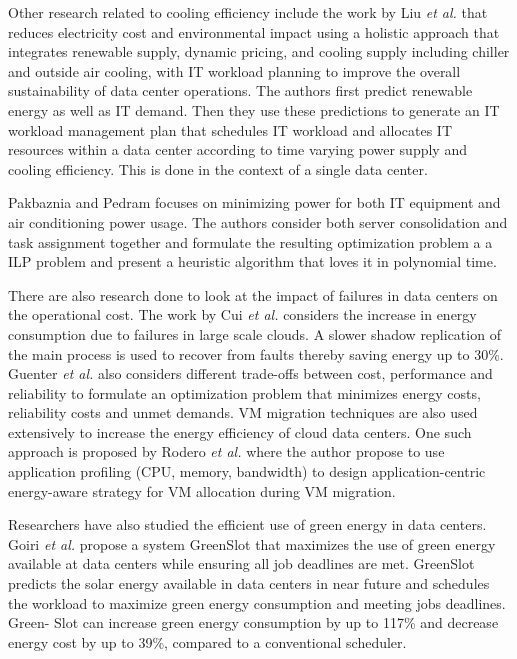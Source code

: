 \documentclass[conference,12pt]{IEEEtran}
\begin{document}
Other research related to cooling efficiency include the work by Liu \textit{et al.} \cite{liu2012renewable}  that reduces electricity cost and environmental impact using a holistic approach that integrates renewable supply, dynamic pricing, and cooling supply including chiller and outside air cooling, with IT workload planning to improve the overall sustainability of data center operations. The authors first predict renewable energy as well as IT demand. Then they use these predictions to generate an IT workload management plan that schedules IT workload and allocates IT resources within a data center according to time varying power supply and cooling efficiency. This is done in the context of a single data center.

\iffalse
Pakbaznia and Pedram \cite{pakbaznia2009minimizing} focuses on minimizing power for both IT equipment and air conditioning power usage. The authors consider both server consolidation and task assignment together and formulate the resulting optimization problem a a ILP problem and present a heuristic algorithm that loves it in polynomial time.

There are also research done to look at the impact of failures in data centers on the operational cost. The work by Cui \textit{et al.} \cite{cui2014shadows} considers the increase in energy consumption due to failures in large scale clouds. A slower shadow replication of the main process is used to recover from faults thereby saving energy up to 30\%. Guenter \textit{et al.} \cite{guenter2011managing} also considers different trade-offs between cost, performance and reliability to formulate an optimization problem that minimizes energy costs, reliability costs and unmet demands. VM migration techniques are also used extensively to increase the energy efficiency of cloud data centers. One such approach is proposed by Rodero \textit{et al.} \cite{rodero2012energy} where the author  propose to use application profiling (CPU, memory, bandwidth) to  design application-centric energy-aware strategy for VM allocation during VM migration.

Researchers have also studied the efficient use of green energy in data centers. Goiri \textit{et al.} \cite{goiri2011greenslot} propose a system GreenSlot that maximizes the use of green energy available at data centers while ensuring all job deadlines are met. GreenSlot predicts the solar energy available in data centers in near future and schedules the workload to maximize green energy consumption and meeting jobs deadlines. Green- Slot can increase green energy consumption by up to 117\% and decrease energy cost by up to 39\%, compared to a conventional scheduler. 
\end{document}
